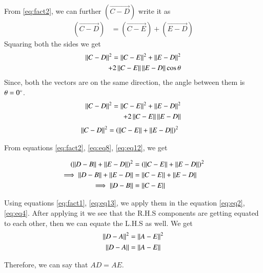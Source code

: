\documentclass[journal,12pt,twocolumn]{IEEEtran}
\begin{document}
	From \eqref{eq:fact2}, we can further $(\vec{C-D})$ write it as
	\begin{align}\label{eq:eq9}
		(\vec{C-D}) &= (\vec{C-E}) + (\vec{E-D})
	\end{align}
	Squaring both the sides we get
	\begin{align} \label{eq:eq10}
		\left\lVert C-D\right\rVert^{2} = \left\lVert C-E\right\rVert^{2} + \left\lVert E-D\right\rVert^{2} \nonumber \\ + 2\left\lVert C-E\right\rVert\left\lVert E-D\right\rVert\cos\theta
	\end{align}
	Since, both the vectors are on the same direction, the angle between them is $\theta = 0\degree$.
	\begin{align} \label{eq:eq11}
		\left\lVert C-D\right\rVert^{2} = \left\lVert C-E\right\rVert^{2} + \left\lVert E-D\right\rVert^{2} \nonumber \\ + 2\left\lVert C-E\right\rVert\left\lVert E-D\right\rVert
	\end{align}
	\begin{align}\label{eq:eq12}
		\left\lVert C-D\right\rVert^{2} &= \left(\left\lVert C-E\right\rVert + \left\lVert E-D\right\rVert\right)^{2}
	\end{align}

	From equations \eqref{eq:fact2}, \eqref{eq:eq8}, \eqref{eq:eq12}, we get
	
	\begin{align}\label{eq:eq13}
		\left(\left\lVert D-B\right\rVert + \left\lVert E-D\right\rVert\right)^{2} &= \left(\left\lVert C-E\right\rVert + \left\lVert E-D\right\rVert\right)^{2} \nonumber \\
		\implies \left\lVert D-B\right\rVert + \left\lVert E-D\right\rVert &= \left\lVert C-E\right\rVert + \left\lVert E-D\right\rVert \nonumber \\
		\implies \left\lVert D-B\right\rVert &= \left\lVert C-E\right\rVert
	\end{align}

	Using equations \eqref{eq:fact1}, \eqref{eq:eq13}, we apply them in the equation \eqref{eq:eq2}, \eqref{eq:eq4}. After applying it we see that the R.H.S components are getting equated to each other, then we can equate the L.H.S as well. We get 
	\begin{align}\label{eq:eq15}
		\left\lVert D-A\right\rVert^{2} &= \left\lVert A-E\right\rVert^{2} \nonumber \\
		\left\lVert D-A\right\rVert &= \left\lVert A-E\right\rVert
	\end{align}
	
	Therefore, we can say that $AD = AE$.
	
\end{document}
